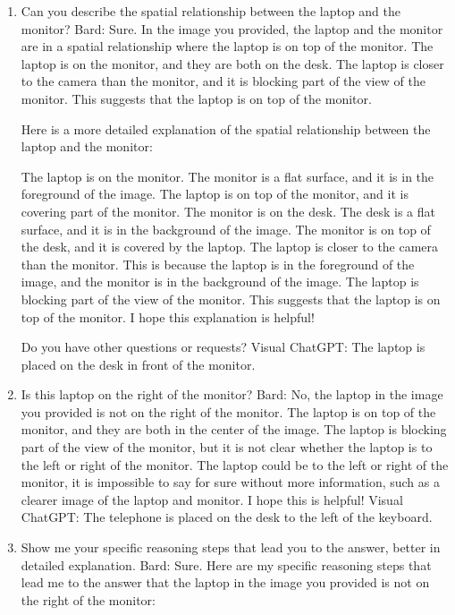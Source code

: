 \begin{enumerate}
    \item Can you describe the spatial relationship between the laptop and the monitor?
    \subitem Bard: 
    Sure. In the image you provided, the laptop and the monitor are in a spatial relationship where the laptop is on top of the monitor. The laptop is on the monitor, and they are both on the desk. The laptop is closer to the camera than the monitor, and it is blocking part of the view of the monitor. This suggests that the laptop is on top of the monitor.

    Here is a more detailed explanation of the spatial relationship between the laptop and the monitor:

    The laptop is on the monitor. The monitor is a flat surface, and it is in the foreground of the image. The laptop is on top of the monitor, and it is covering part of the monitor.
    The monitor is on the desk. The desk is a flat surface, and it is in the background of the image. The monitor is on top of the desk, and it is covered by the laptop.
    The laptop is closer to the camera than the monitor. This is because the laptop is in the foreground of the image, and the monitor is in the background of the image.
    The laptop is blocking part of the view of the monitor. This suggests that the laptop is on top of the monitor.
    I hope this explanation is helpful!

    Do you have other questions or requests?
    \subitem Visual ChatGPT: The laptop is placed on the desk in front of the monitor.
    \item Is this laptop on the right of the monitor?
    \subitem Bard: 
    No, the laptop in the image you provided is not on the right of the monitor. The laptop is on top of the monitor, and they are both in the center of the image. The laptop is blocking part of the view of the monitor, but it is not clear whether the laptop is to the left or right of the monitor. The laptop could be to the left or right of the monitor, it is impossible to say for sure without more information, such as a clearer image of the laptop and monitor.
    I hope this is helpful!
    \subitem Visual ChatGPT: The telephone is placed on the desk to the left of the keyboard.
    \item Show me your specific reasoning steps that lead you to the answer, better in detailed explanation.
    \subitem Bard: 
    Sure. Here are my specific reasoning steps that lead me to the answer that the laptop in the image you provided is not on the right of the monitor:
    

\end{enumerate}
